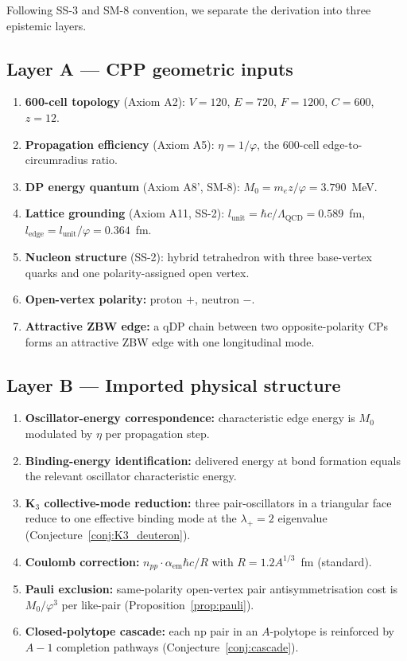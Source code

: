 \documentclass[11pt,letterpaper]{article}
\newcommand{\phig}{\varphi}
\newcommand{\Mzero}{M_0}
\newcommand{\lunit}{l_{\mathrm{unit}}}
\newcommand{\ledge}{l_{\mathrm{edge}}}
\newcommand{\LQCD}{\Lambda_{\mathrm{QCD}}}
\newcommand{\npp}{n_{pp}}
\begin{document}
Following SS-3 and SM-8 convention, we separate the derivation into three epistemic layers.

\subsection{Layer A --- CPP geometric inputs}
\label{sec:LayerA}

\begin{enumerate}[label=(A\arabic*)]
\item \textbf{600-cell topology} (Axiom A2): $V = 120$, $E = 720$, $F = 1200$, $C = 600$, $z = 12$.
\item \textbf{Propagation efficiency} (Axiom A5): $\eta = 1/\phig$, the 600-cell edge-to-circumradius ratio.
\item \textbf{DP energy quantum} (Axiom A8', SM-8): $\Mzero = m_e z/\phig = 3.790$~MeV.
\item \textbf{Lattice grounding} (Axiom A11, SS-2): $\lunit = \hbar c / \LQCD = 0.589$~fm, $\ledge = \lunit/\phig = 0.364$~fm.
\item \textbf{Nucleon structure} (SS-2): hybrid tetrahedron with three base-vertex quarks and one polarity-assigned open vertex.
\item \textbf{Open-vertex polarity:} proton $+$, neutron $-$.
\item \textbf{Attractive ZBW edge:} a qDP chain between two opposite-polarity CPs forms an attractive ZBW edge with one longitudinal mode.
\end{enumerate}

\subsection{Layer B --- Imported physical structure}
\label{sec:LayerB}

\begin{enumerate}[label=(B\arabic*)]
\item \textbf{Oscillator-energy correspondence:} characteristic edge energy is $\Mzero$ modulated by $\eta$ per propagation step.
\item \textbf{Binding-energy identification:} delivered energy at bond formation equals the relevant oscillator characteristic energy.
\item \textbf{K$_3$ collective-mode reduction:} three pair-oscillators in a triangular face reduce to one effective binding mode at the $\lambda_+ = 2$ eigenvalue (Conjecture~\ref{conj:K3_deuteron}).
\item \textbf{Coulomb correction:} $\npp \cdot \alpha_{\mathrm{em}} \hbar c / R$ with $R = 1.2 A^{1/3}$~fm (standard).
\item \textbf{Pauli exclusion:} same-polarity open-vertex pair antisymmetrisation cost is $\Mzero/\phig^3$ per like-pair (Proposition~\ref{prop:pauli}).
\item \textbf{Closed-polytope cascade:} each np pair in an $A$-polytope is reinforced by $A-1$ completion pathways (Conjecture~\ref{conj:cascade}).
\end{enumerate}
\end{document}
